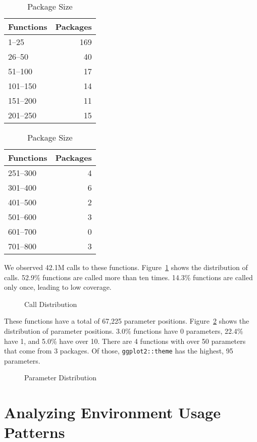 \documentclass[10pt,review,sigplan,anonymous=true,authorversion=true,nonacm=true]{acmart}
\begin{document}
\begin{table}[!h]
  \vspace{-2mm}
  \small
  \caption{Package Size} \label{table:packsize}
  \centering
  \begin{tabular}{lr}
    \toprule
    \bf Functions&\bf Packages\\
    \midrule
    1--25&169\\
    26--50&40\\
    51--100&17\\
    101--150&14\\
    151--200&11\\
    201--250&15\\
    \bottomrule
  \end{tabular}
  \quad
  \begin{tabular}{lr}
    \toprule
    \bf Functions&\bf Packages\\
    \midrule
    251--300&4\\
    301--400&6\\
    401--500&2\\
    501--600&3\\
    601--700&0\\
    701--800&3\\
    \bottomrule
  \end{tabular}
\end{table}

We observed 42.1M calls to these functions. Figure~\ref{fig:calldist} shows the
distribution of calls. 52.9\% functions are called more than ten times. 14.3\%
functions are called only once, leading to low coverage.

\begin{figure}[!h]
  \centering
  
  \caption{Call Distribution}
  \label{fig:calldist}
\end{figure}

These functions have a total of 67,225 parameter positions.
Figure~\ref{fig:paramdist} shows the distribution of parameter positions.
3.0\% functions have 0 parameters, 22.4\% have 1, and 5.0\% have over
10. There are 4 functions with over 50 parameters that come from 3 packages. Of
those, \texttt{ggplot2::theme} has the highest, 95 parameters.

\begin{figure}[!h]
  \centering
  
  \caption{Parameter Distribution}
  \label{fig:paramdist}
\end{figure}

\section{Analyzing Environment Usage Patterns}
\end{document}
